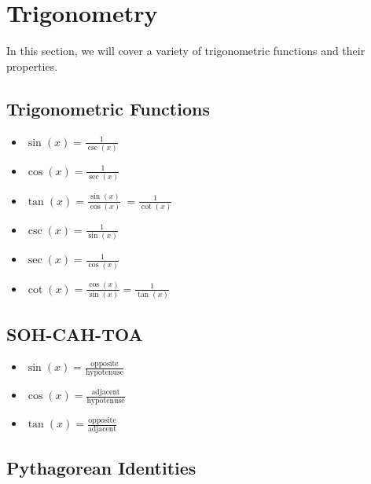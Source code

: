 \newpage
\section{Trigonometry}

In this section, we will cover a variety of trigonometric functions and their properties.

\subsection{Trigonometric Functions}

\begin{itemize}

    \item \( \sin(x) = \frac{1}{\csc(x)} \)

    \item \( \cos(x) = \frac{1}{\sec(x)}\)

    \item \( \tan(x) = \frac{\sin(x)}{\cos(x)}\ = \frac{1}{\cot(x)}\)

    \item \( \csc(x) = \frac{1}{\sin(x)} \)

    \item \( \sec(x) = \frac{1}{\cos(x)} \)

    \item \( \cot(x) = \frac{\cos(x)}{\sin(x)} = \frac{1}{\tan(x)} \)

\end{itemize}

\subsection{SOH-CAH-TOA}

\begin{itemize}

    \item \( \sin(x) = \frac{\text{opposite}}{\text{hypotenuse}} \)

    \item \( \cos(x) = \frac{\text{adjacent}}{\text{hypotenuse}} \)

    \item \( \tan(x) = \frac{\text{opposite}}{\text{adjacent}} \)

\end{itemize}

\subsection{Pythagorean Identities}

